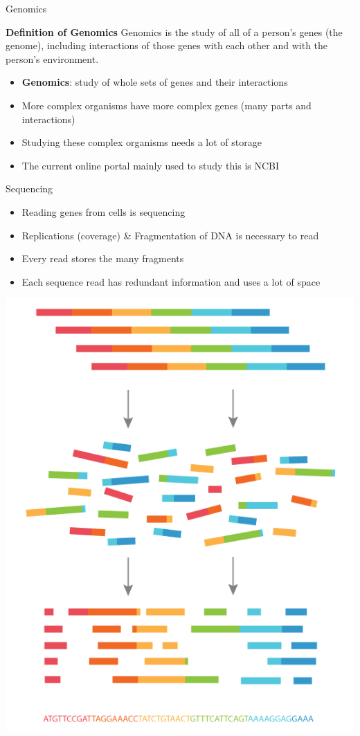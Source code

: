\documentclass{beamer}
\begin{document}
\begin{frame}{Genomics}
  \begin{block} {\textbf{Definition of Genomics}}
    Genomics is the study of all of a person's genes (the genome), including interactions of those genes with each other and with the person's environment. \cite{genomics-definition}
  \end{block}
  \begin{itemize}   
    \item \textbf{Genomics}: study of whole sets of genes and their interactions \cite{campbell}
    \item More complex organisms have more complex genes (many parts and interactions)
    \item Studying these complex organisms needs a lot of storage
    \item The current online portal mainly used to study this is NCBI \cite{campbell}
  \end{itemize}
\end{frame}

\begin{frame}{Sequencing}
  \begin{itemize}   
    \item Reading genes from cells is sequencing
    \item Replications (coverage) \& Fragmentation of DNA is necessary to read
    \item Every read stores the many fragments
    \item Each sequence read has redundant information and uses a lot of space
  \end{itemize}
  \centering
  \includegraphics[scale=0.2]{sequencing.png}
\end{frame}
\end{document}
